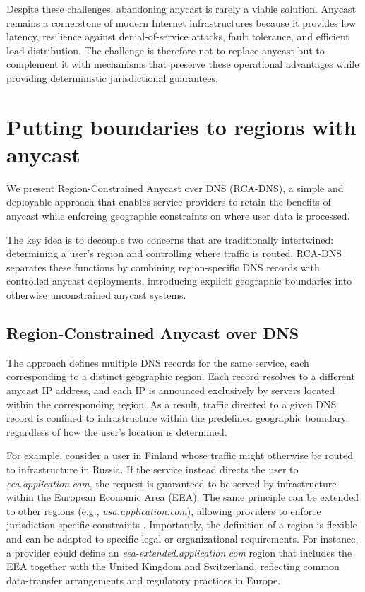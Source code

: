 \documentclass[acmsmall]{acmart}
\begin{document}
Despite these challenges, abandoning anycast is rarely a viable solution. Anycast remains a cornerstone of modern Internet infrastructures because it provides low latency, resilience against denial-of-service attacks, fault tolerance, and efficient load distribution. The challenge is therefore not to replace anycast but to complement it with mechanisms that preserve these operational advantages while providing deterministic jurisdictional guarantees.

\section{Putting boundaries to regions with anycast}
\label{sec:solution}

We present Region-Constrained Anycast over DNS (RCA-DNS), a simple and deployable approach that enables service providers to retain the benefits of anycast while enforcing geographic constraints on where user data is processed. 

The key idea is to decouple two concerns that are traditionally intertwined: determining a user’s region and controlling where traffic is routed. RCA-DNS separates these functions by combining region-specific DNS records with controlled anycast deployments, introducing explicit geographic boundaries into otherwise unconstrained anycast systems.

\subsection{Region-Constrained Anycast over DNS}

The approach defines multiple DNS records for the same service, each corresponding to a distinct geographic region. Each record resolves to a different anycast IP address, and each IP is announced exclusively by servers located within the corresponding region. As a result, traffic directed to a given DNS record is confined to infrastructure within the predefined geographic boundary, regardless of how the user’s location is determined.

For example, consider a user in Finland whose traffic might otherwise be routed to infrastructure in Russia. If the service instead directs the user to \textit{eea.application.com}, the request is guaranteed to be served by infrastructure within the European Economic Area (EEA). The same principle can be extended to other regions (e.g., \textit{usa.application.com}), allowing providers to enforce jurisdiction-specific constraints \cite{Rep.Pallone2024Text2024, ECFRAdversaries.}. Importantly, the definition of a region is flexible and can be adapted to specific legal or organizational requirements. For instance, a provider could define an \textit{eea-extended.application.com} region that includes the EEA together with the United Kingdom and Switzerland, reflecting common data-transfer arrangements and regulatory practices in Europe. 
\end{document}
